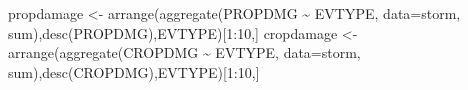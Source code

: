 \documentclass[
]{article}
\newenvironment{Shaded}{\begin{snugshade}}{\end{snugshade}}
\newcommand{\AttributeTok}[1]{\textcolor[rgb]{0.77,0.63,0.00}{#1}}
\newcommand{\DecValTok}[1]{\textcolor[rgb]{0.00,0.00,0.81}{#1}}
\newcommand{\FunctionTok}[1]{\textcolor[rgb]{0.00,0.00,0.00}{#1}}
\newcommand{\NormalTok}[1]{#1}
\newcommand{\OtherTok}[1]{\textcolor[rgb]{0.56,0.35,0.01}{#1}}
\newcommand{\SpecialCharTok}[1]{\textcolor[rgb]{0.00,0.00,0.00}{#1}}
\begin{document}
\begin{Shaded}
\begin{Highlighting}[]
\NormalTok{propdamage }\OtherTok{\textless{}{-}} \FunctionTok{arrange}\NormalTok{(}\FunctionTok{aggregate}\NormalTok{(PROPDMG }\SpecialCharTok{\textasciitilde{}}\NormalTok{ EVTYPE, }\AttributeTok{data=}\NormalTok{storm, sum),}\FunctionTok{desc}\NormalTok{(PROPDMG),EVTYPE)[}\DecValTok{1}\SpecialCharTok{:}\DecValTok{10}\NormalTok{,]}
\NormalTok{cropdamage }\OtherTok{\textless{}{-}} \FunctionTok{arrange}\NormalTok{(}\FunctionTok{aggregate}\NormalTok{(CROPDMG }\SpecialCharTok{\textasciitilde{}}\NormalTok{ EVTYPE, }\AttributeTok{data=}\NormalTok{storm, sum),}\FunctionTok{desc}\NormalTok{(CROPDMG),EVTYPE)[}\DecValTok{1}\SpecialCharTok{:}\DecValTok{10}\NormalTok{,]}
\end{Highlighting}
\end{Shaded}
\end{document}
